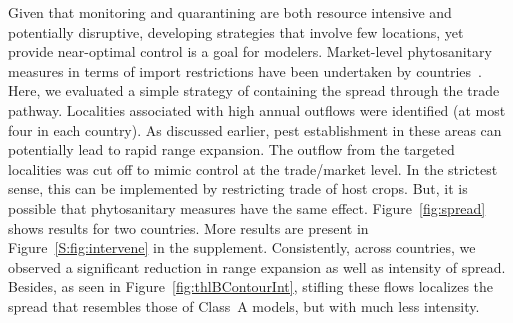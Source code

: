 \documentclass[11pt]{article}
\theoremstyle{definition}
\begin{document}
Given that monitoring and quarantining are both resource intensive and
potentially disruptive, developing strategies that involve few locations,
yet provide near-optimal control is a goal for modelers.  Market-level
phytosanitary measures in terms of import restrictions have been undertaken
by countries~\cite{USDA2012}. Here, we evaluated a simple strategy of
containing the spread through the trade pathway. Localities associated with
high annual outflows were identified (at most four in each country). As
discussed earlier, pest establishment in these areas can potentially lead
to rapid range expansion. The outflow from the targeted localities was cut
off to mimic control at the trade/market level. In the strictest sense,
this can be implemented by restricting trade of host crops. But, it is
possible that phytosanitary measures have the same effect.
Figure~\ref{fig:spread} shows results for two countries.  More results are
present in Figure~\ref{S:fig:intervene} in the supplement.  Consistently,
across countries, we observed a significant reduction in range expansion as
well as intensity of spread.  Besides, as seen in
Figure~\ref{fig:thlBContourInt}, stifling these flows localizes the spread
that resembles those of Class~A models, but with much less intensity.
\end{document}

